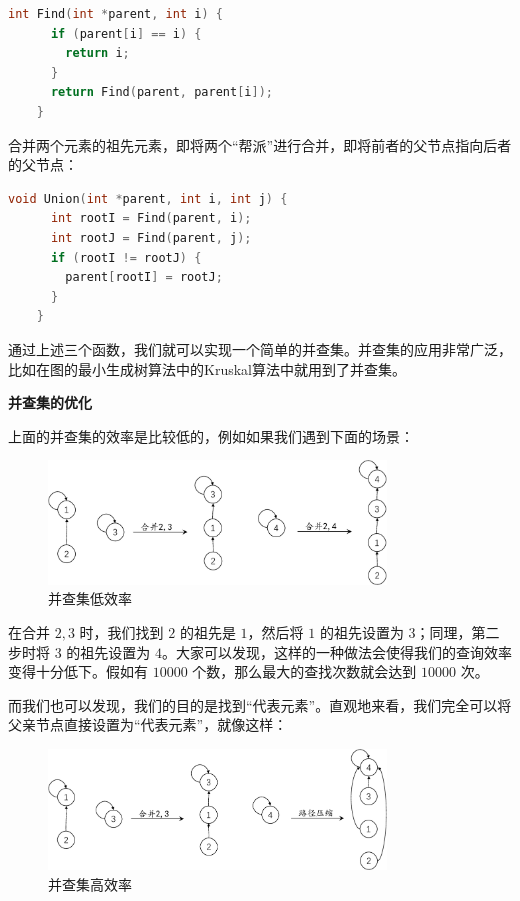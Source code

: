 \documentclass[lang=cn,newtx,10pt,scheme=chinese]{../elegantbook}
\begin{document}
  \begin{lstlisting}[language=C++, caption={查找元素的祖先元素}]
    int Find(int *parent, int i) {
      if (parent[i] == i) {
        return i;
      }
      return Find(parent, parent[i]);
    }

  \end{lstlisting}

  合并两个元素的祖先元素，即将两个“帮派”进行合并，即将前者的父节点指向后者的父节点：

  \begin{lstlisting}[language=C++, caption={合并两个元素的祖先元素}]
    void Union(int *parent, int i, int j) {
      int rootI = Find(parent, i);
      int rootJ = Find(parent, j);
      if (rootI != rootJ) {
        parent[rootI] = rootJ;
      }
    }
  \end{lstlisting}

  通过上述三个函数，我们就可以实现一个简单的并查集。并查集的应用非常广泛，比如在图的最小生成树算法中的Kruskal算法中就用到了并查集。

  \textbf{并查集的优化}

  上面的并查集的效率是比较低的，例如如果我们遇到下面的场景：

  \begin{figure}
    \centering
    \includegraphics[width=0.8\textwidth]{./figure/pdf/cropped/unionFindLow.pdf}
    \caption{并查集低效率}
    \label{fig:unionFind6}
  \end{figure}

  在合并 $2, 3$ 时，我们找到 $2$ 的祖先是 $1$，然后将 $1$ 的祖先设置为 $3$；同理，第二步时将 $3$ 的祖先设置为 $4$。大家可以发现，这样的一种做法会使得我们的查询效率变得十分低下。假如有 $10000$ 个数，那么最大的查找次数就会达到 $10000$ 次。

  而我们也可以发现，我们的目的是找到“代表元素”。直观地来看，我们完全可以将父亲节点直接设置为“代表元素”，就像这样：

  \begin{figure}[h!]
    \centering
    \includegraphics[width=0.8\textwidth]{./figure/pdf/cropped/pathCompress.pdf}
    \caption{并查集高效率}
    \label{fig:unionFind7}
  \end{figure}
\end{document}
